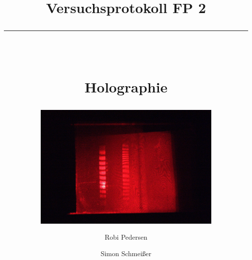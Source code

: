\documentclass[a4paper,oneside,bibliography=totocnumbered]{scrartcl} %
\title{Versuchsprotokoll FP 2\\
\rule{0.5\textwidth}{0.4pt}\\
\vspace*{1cm}
\begin{Huge}
Holographie 
\end{Huge}
}
\subtitle{\vspace*{1cm}
\includegraphics[width=0.7\textwidth]{Photos/IMG_3909.jpg}
\vspace*{1.5cm}}
\author{Robi Pedersen \and Simon Schmeißer}
\date{Versuchsdurchführung 07.04. - 11.04.2011
\vspace*{1cm}\\
\rule{0.8\textwidth}{0.4pt}\\
Physikalisches Institut, Albert-Ludwigs-Universität Freiburg
}
\begin{document}
\begin{titlepage}
  \maketitle
  \vfill
  \thispagestyle{empty}
\end{titlepage}

\tableofcontents
\clearpage







%
%



\clearpage

 

\end{document}
